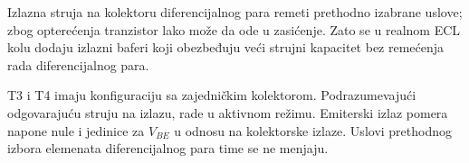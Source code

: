 Izlazna struja na kolektoru diferencijalnog para remeti prethodno izabrane uslove; zbog opterećenja tranzistor lako može da ode u zasićenje. Zato se u realnom ECL kolu dodaju izlazni baferi koji obezbeđuju veći strujni kapacitet bez remećenja rada diferencijalnog para.

T3 i T4 imaju konfiguraciju sa zajedničkim kolektorom. Podrazumevajući odgovarajuću struju na izlazu, rade u aktivnom režimu. Emiterski izlaz pomera napone nule i jedinice za $V_{BE}$ u odnosu na kolektorske izlaze. Uslovi prethodnog izbora elemenata diferencijalnog para time se ne menjaju.
